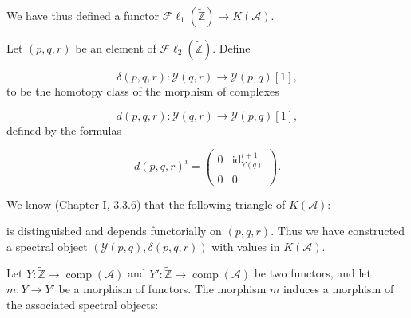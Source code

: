 \clearpage
{}%
\begingroup\small\setlength{\parskip}{0pt}\setlength{\emergencystretch}{1.5em}
\setlength{\abovedisplayskip}{4pt plus 2pt minus 2pt}%
\setlength{\belowdisplayskip}{4pt plus 2pt minus 2pt}%

We have thus defined a functor
$\mathcal{F}\ell_1(\widetilde{\mathbb Z})\longrightarrow K(\mathcal A)$.

Let $(p,q,r)$ be an element of
$\mathcal{F}\ell_2(\widetilde{\mathbb Z})$. Define

\begin{equation}
\delta(p,q,r)\colon\mathcal Y(q,r)\longrightarrow\mathcal Y(p,q)[1],
\tag{4.1.1.6}
\end{equation}
to be the homotopy class of the morphism of complexes

\begin{equation}
d(p,q,r)\colon\mathcal Y(q,r)\longrightarrow\mathcal Y(p,q)[1],
\tag{4.1.1.7}
\end{equation}
defined by the formulas

\begin{equation}
d(p,q,r)^i=
\begin{pmatrix}
0 & \operatorname{id}_{Y(q)}^{i+1}\\
0 & 0
\end{pmatrix}.
\tag{4.1.1.8}
\end{equation}

We know (Chapter I, 3.3.6) that the following triangle of $K(\mathcal A)$:

\begin{center}
\end{center}
is distinguished and depends functorially on $(p,q,r)$. Thus we have
constructed a spectral object $(\mathcal Y(p,q),\delta(p,q,r))$ with values
in $K(\mathcal A)$.

Let $Y\colon\widetilde{\mathbb Z}\longrightarrow
\operatorname{comp}(\mathcal A)$ and
$Y'\colon\widetilde{\mathbb Z}\longrightarrow
\operatorname{comp}(\mathcal A)$ be two functors, and let
$m\colon Y\longrightarrow Y'$ be a morphism of functors. The morphism $m$
induces a morphism of the associated spectral objects:

